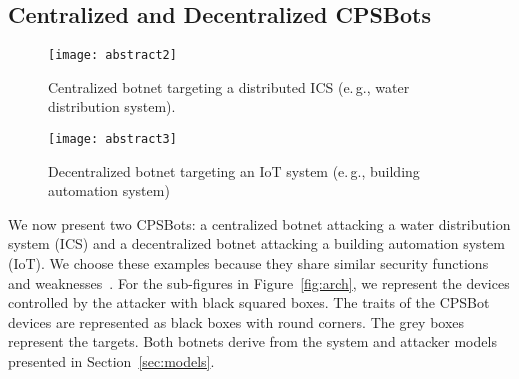 \documentclass[sigconf]{acmart}
\makeatletter
\newcommand{\eg}{e.\@\,g.,\@\xspace}
\newcommand{\Botnet}{CPSBot\@\xspace}
\newcommand{\Botnets}{CPSBots\@\xspace}
\makeatother
\begin{document}
\subsection{Centralized and Decentralized \Botnets}
\label{sec:examples}

\begin{figure*}[tb]
    \centering
    \begin{subfigure}[b]{0.46\linewidth}
        \texttt{[image: abstract2]}
        \caption{Centralized botnet targeting a distributed ICS (\eg water distribution system).}
        \label{fig:arch-centralized}
    \end{subfigure}
    \hfill
    \begin{subfigure}[b]{0.46\linewidth}
        \texttt{[image: abstract3]}
        \caption{Decentralized botnet targeting an IoT system (\eg building automation        system)}
        \label{fig:arch-decentralized}
    \end{subfigure}

    \caption{High-level view of an ICS and IoT \Botnet. Grey boxes
    represent the targets. The black boxes are the devices controlled by
    the attacker.
    Rounded black boxes represent the traits supported by the
    \Botnet devices.}
    \label{fig:arch}
\end{figure*}

We now present two \Botnets: a centralized botnet attacking a water
distribution system (ICS) and a decentralized botnet attacking a building
automation system (IoT). We choose these examples because they share similar
security functions and weaknesses~\cite{brandstetter2017bas}. For the
sub-figures in Figure~\ref{fig:arch}, we represent the devices controlled by
the attacker with black squared boxes. The traits of the \Botnet devices are
represented as black boxes with round corners. The grey boxes represent the
targets. Both botnets derive from the system and attacker models presented in
Section~\ref{sec:models}.
\end{document}
